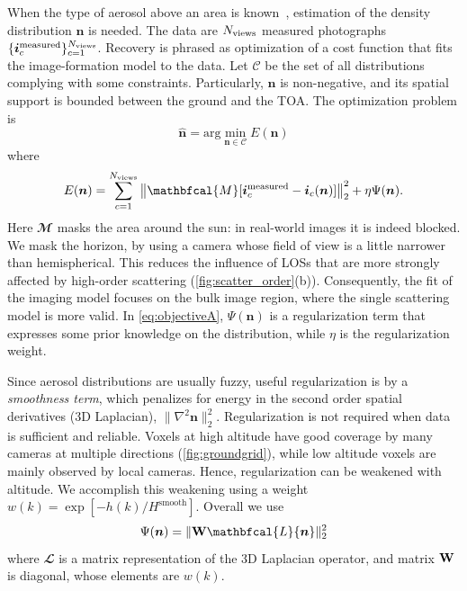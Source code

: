 \documentclass[10pt,letterpaper]{article}
\newcommand{\argmin}{\mathrm{arg}\min}
\newcommand{\vect}[1]{\bm{#1}}
\newcommand{\MaskSun}{\mathbfcal{M}}
\newcommand{\Laplacian}{\mathbfcal{L}}
\newcommand{\DistSet}{\mathcal{C}}
\newcommand{\DistUnknown}{\vect{n}}
\newcommand{\DistEstimated}{\hat{\vect{n}}}
\newcommand{\CostFunc}[1]{E(#1)}
\begin{document}
When the type of aerosol above an area is known~\cite{Martonchik2009},
estimation of the density distribution $\DistUnknown$ is needed. The
data are $N_{\rm views}$ measured photographs $\{ {\bm i}^{\rm
  measured}_c\}_{c=1}^{N_{\rm views}}$. Recovery is phrased as
optimization of a cost function that fits the image-formation model to
the data. Let $\DistSet$ be the set of all distributions complying
with some constraints.  Particularly, $\DistUnknown$ is non-negative,
and its spatial support is bounded between the ground and the TOA. The
optimization problem is
\begin{equation}
  \label{eq:minobjectiveA}
  \DistEstimated =
  \argmin_{\DistUnknown \in \DistSet} \CostFunc{\DistUnknown}
\end{equation}
where
\begin{equation}
  \label{eq:objectiveA}
  \CostFunc{\DistUnknown}
  = \sum_{c=1}^{N_{\rm views}}
  \left\|
    \MaskSun[{\bm i}^{\rm measured}_c - {\bm i}_c({\bm n})]
  \right\|^2_2  + \eta \Psi({\bm n}).
\end{equation}
Here $\MaskSun$ masks the area around the sun: in real-world images
it is indeed blocked. We mask the horizon, by using a camera whose
field of view is a little narrower than hemispherical. This reduces
the influence of LOSs that are more strongly affected by high-order
scattering (\cref{fig:scatter_order}(b)). Consequently,
the fit of the imaging model focuses on the bulk image region, where
the single scattering model is more valid.  In \cref{eq:objectiveA},
$\Psi({\bm n})$ is a regularization term that expresses some prior
knowledge on the distribution, while $\eta$ is the regularization weight.

Since aerosol distributions are usually fuzzy, useful regularization
is by a {\em smoothness term}, which penalizes for energy in the second order
spatial derivatives (3D Laplacian), $\| \nabla^2{\bm
  n}\|^2_2$. Regularization is not required when data is sufficient
and reliable.  Voxels at high
altitude have good coverage by many cameras at multiple directions (\cref{fig:groundgrid}),
while low altitude voxels are mainly observed by local
cameras. Hence, regularization can be weakened with altitude. We
accomplish this weakening using a weight
$w(k)=\exp\left[-h(k)/H^\mathrm{smooth}\right]$.  Overall we use
\begin{equation}
  \label{eq:regularizer}
  \Psi({\bm n}) = \| {\bf W} \Laplacian{\bm n}\|^2_2
\end{equation}
where $\Laplacian$ is a matrix representation of the 3D Laplacian
operator, and matrix ${\bf W}$ is diagonal, whose elements are $w(k)$.
\end{document}

